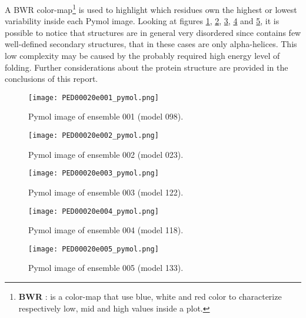 \medskip
A BWR color-map\footnote{\textbf{BWR} : is a color-map that use blue, white and red color to characterize respectively low, mid and high values inside a plot.} is used to highlight which residues own the highest or lowest variability inside each Pymol image.
Looking at figures \ref{model001p}, \ref{model002p}, \ref{model003p}, \ref{model004p} and \ref{model005p}, it is possible to notice that structures are in general very disordered since contains few well-defined secondary structures, that in these cases are only alpha-helices. This low complexity may be caused by the probably required high energy level of folding.
Further considerations about the protein structure are provided in the conclusions of this report.

\begin{figure}[H]
    \centering
		\texttt{[image: PED00020e001\_pymol.png]}
		\caption{Pymol image of ensemble 001 (model 098).}
		\label{model001p}
\end{figure}

\begin{figure}[H]
    \centering
		\texttt{[image: PED00020e002\_pymol.png]}
		\caption{Pymol image of ensemble 002 (model 023).}
		\label{model002p}
\end{figure}

\begin{figure}[H]
    \centering
		\texttt{[image: PED00020e003\_pymol.png]}
		\caption{Pymol image of ensemble 003 (model 122).}
		\label{model003p}
\end{figure}

\begin{figure}[H]
    \centering
		\texttt{[image: PED00020e004\_pymol.png]}
		\caption{Pymol image of ensemble 004 (model 118).}
		\label{model004p}
\end{figure}

\begin{figure}[H]
    \centering
		\texttt{[image: PED00020e005\_pymol.png]}
		\caption{Pymol image of ensemble 005 (model 133).}
		\label{model005p}
\end{figure}
